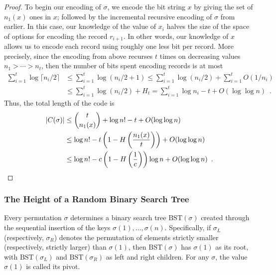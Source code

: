 \documentclass{patmorin}
\begin{document}
\begin{proof}
  To begin our encoding of $\sigma$, we encode the bit string $x$ by
  giving the set of $n_1(x)$ ones in $x$; followed by the incremental
  recursive encoding of $\sigma$ from earlier. In this case, our
  knowledge of the value of $x_i$ halves the size of the space of
  options for encoding the record $r_{i + 1}$. In other words, our
  knowledge of $x$ allows us to encode each record using roughly one
  less bit per record. More precisely, since the encoding from above
  recurses $t$ times on decreasing values $n_1 > \cdots > n_t$, then
  the number of bits spent encoding records is at most
  \begin{align*}
    \sum_{i = 1}^t \log \lceil n_i/2 \rceil &\leq \sum_{i = 1}^t \log (n_i/2 + 1)
                                              \leq \sum_{i = 1}^t \log (n_i/2) + \sum_{i = 1}^t O(1/n_i) \\
                                            &\leq \sum_{i = 1}^t \log (n_i/2) + H_t = \sum_{i = 1}^t \log n_i - t + O(\log \log n) \enspace .
  \end{align*}
  Thus, the total length of the code is
  \begin{align*}
    |C(\sigma)| &\leq \binom{t}{n_1(x)} + \log n! - t + O(\log \log n) \\
                &\leq \log n! - t \left(1 - H\left(\frac{n_1(x)}{t}\right)\right) + O(\log \log n) \\ %
                &\leq \log n! - c \left(1 - H\left(\frac{1}{c}\right)\right)\log n + O(\log \log n) \enspace . \qedhere
  \end{align*}
\end{proof}

\subsubsection{The Height of a Random Binary Search Tree}

Every permutation $\sigma$ determines a binary search tree
$\text{BST}(\sigma)$ created through the sequential insertion of the
keys $\sigma(1), \ldots, \sigma(n)$. Specifically, if $\sigma_L$
(respectively, $\sigma_R$) denotes the permutation of elements
strictly smaller (respectively, strictly larger) than $\sigma(1)$,
then $\text{BST}(\sigma)$ has $\sigma(1)$ as its root, with
$\text{BST}(\sigma_L)$ and $\text{BST}(\sigma_R)$ as left and right
children. For any $\sigma$, the value $\sigma(1)$ is called its pivot.
\end{document}
